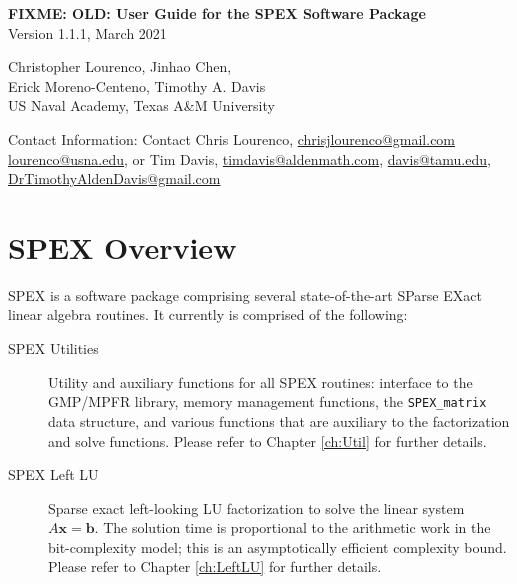 \documentclass[12pt]{report}
\theoremstyle{definition}
\begin{document}
\begin{center}
\begin{large}
\textbf{FIXME: OLD: User Guide for the SPEX Software Package} \\
\vspace{5mm}
Version 1.1.1, March 2021 %
\vspace{20mm}

Christopher Lourenco, Jinhao Chen, \\ Erick Moreno-Centeno, Timothy A. Davis \\

US Naval Academy, Texas A\&M University

\vspace{20mm}
Contact Information: Contact Chris Lourenco, \href{mailto:chrisjlourenco@gmail.com}{chrisjlourenco@gmail.com} \href{mailto:lourenco@usna.edu}{lourenco@usna.edu}, or Tim Davis,
\href{mailto:timdavis@aldenmath.com}{timdavis@aldenmath.com},
\href{mailto:davis@tamu.edu}{davis@tamu.edu},
\href{DrTimothyAldenDavis@gmail.com}{DrTimothyAldenDavis@gmail.com}

\end{large}
\end{center}

\newpage
\tableofcontents

\newpage
    
\chapter{SPEX Overview}

SPEX is a software package comprising several state-of-the-art SParse EXact
linear algebra routines. It currently is comprised of the following:

\begin{description}
\item[SPEX Utilities] Utility and auxiliary functions for all SPEX routines: interface to the GMP/MPFR library, memory management functions, the \verb|SPEX_matrix| data structure, and various functions that are auxiliary to the factorization and solve functions. Please refer to Chapter \ref{ch:Util} for further details.
\item[SPEX Left LU] Sparse exact left-looking LU factorization to solve the linear system $A \mathbf{x} = \mathbf{b}$. The solution time is proportional to the arithmetic work in the bit-complexity model; this is an asymptotically efficient complexity bound. Please refer to Chapter \ref{ch:LeftLU} for further details.
\end{description}
\end{document}
